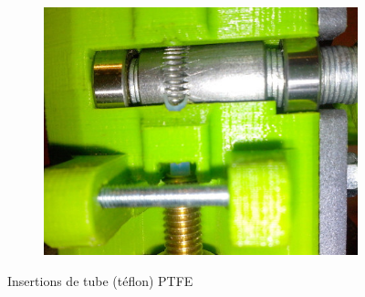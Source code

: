\documentclass[11pt,a4paper]{article}
\begin{document}
\begin{figure}[H]
    ~ %
    \begin{subfigure}[b]{0.3\textwidth}
        \includegraphics[width=\textwidth,cfbox=azul_marcos 4pt 0pt]{FOTOS/TEFLON3}
    \end{subfigure}
    \caption*{Insertions de tube (téflon) PTFE}
\end{figure}
\end{document}
